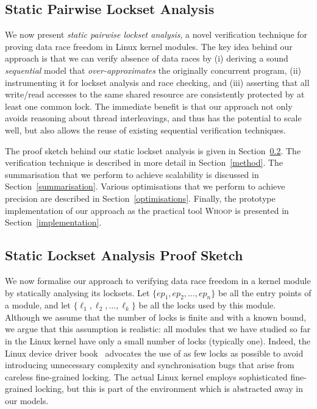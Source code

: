 \subsection{Static Pairwise Lockset Analysis}
\label{tech:analysis}


We now present \emph{static pairwise lockset analysis}, a novel verification technique for proving data race freedom in Linux kernel modules. The key idea behind our approach is that we can verify absence of data races by (i) deriving a sound \emph{sequential} model that \emph{over-approximates} the originally concurrent program, (ii) instrumenting it for lockset analysis and race checking, and (iii) asserting that all write/read accesses to the same shared resource are consistently protected by at least one common lock. The immediate benefit is that our approach not only avoids reasoning about thread interleavings, and thus has the potential to scale well, but also allows the reuse of existing sequential verification techniques.

The proof sketch behind our static lockset analysis is given in Section~\ref{proof}. The verification technique is described in more detail in Section~\ref{method}. The summarisation that we perform to achieve scalability is discussed in Section~\ref{summarisation}. Various optimisations that we perform to achieve precision are described in Section~\ref{optimisations}. Finally, the prototype implementation of our approach as the practical tool \textsc{Whoop} is presented in Section~\ref{implementation}.

\subsection{Static Lockset Analysis Proof Sketch}
\label{proof}

We now formalise our approach to verifying data race freedom in a kernel module by statically analysing its locksets. Let $\{\mathit{ep}_{1}, \mathit{ep}_{2}, \dotsc, \mathit{ep}_{n}\}$ be all the entry points of a module, and let $\{\ell_{1}, \ell_{2}, \dotsc, \ell_{k}\}$ be all the locks used by this module. Although we assume that the number of locks is finite and with a known bound, we argue that this assumption is realistic: all modules that we have studied so far in the Linux kernel have only a small number of locks (typically one). Indeed, the Linux device driver book~\cite{corbet2005linux} advocates the use of as few locks as possible to avoid introducing unnecessary complexity and synchronisation bugs that arise from careless fine-grained locking. The actual Linux kernel employs sophisticated fine-grained locking, but this is part of the environment which is abstracted away in our models.


